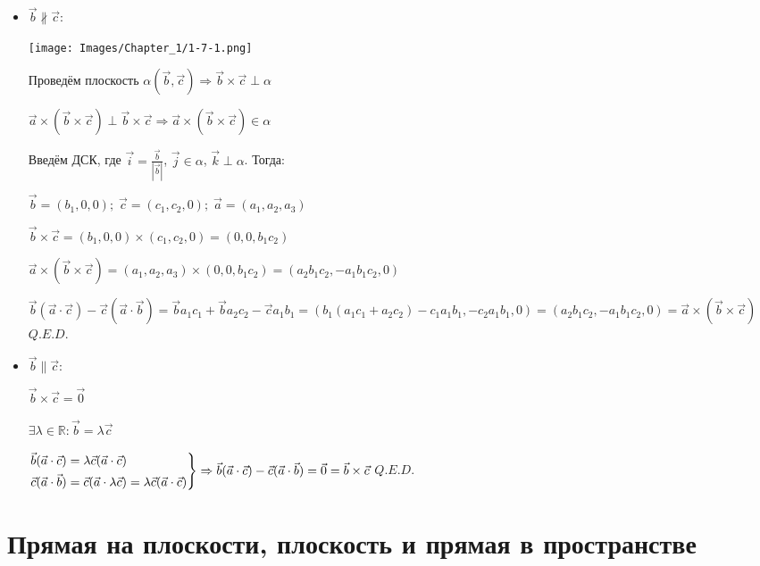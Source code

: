 \begin{itemize}
    \item \(\vec b \nparallel \vec c\):
          \begin{center}
              \texttt{[image: Images/Chapter\_1/1-7-1.png]}
          \end{center}
          Проведём плоскость \(\alpha(\vec b, \vec c) \Rightarrow \vec b \times \vec c \perp \alpha\)

          \(\vec a \times (\vec b \times \vec c) \perp \vec b \times \vec c \Rightarrow \vec a \times (\vec b \times \vec c) \in \alpha\)

          Введём ДСК, где \(\vec i = \frac{\vec b}{|\vec b|}\), \(\vec j \in \alpha\), \(\vec k \perp \alpha\). Тогда:

          \(\vec b = (b_1, 0, 0);\; \vec c = (c_1, c_2, 0);\; \vec a = (a_1, a_2, a_3)\)

          \(\vec b \times \vec c = (b_1, 0, 0) \times (c_1, c_2, 0) = (0, 0, b_1 c_2)\)

          \(\vec a \times (\vec b \times \vec c) = (a_1, a_2, a_3) \times (0, 0, b_1 c_2) = (a_2 b_1 c_2, -a_1 b_1 c_2, 0)\)

          \(\vec b(\vec a \cdot \vec c) - \vec c(\vec a \cdot \vec b) = \vec b a_1 c_1 + \vec b a_2 c_2 - \vec c a_1 b_1 =
          (b_1(a_1 c_1 + a_2 c_2) - c_1 a_1 b_1, -c_2 a_1 b_1, 0) =
          (a_2 b_1 c_2, -a_1 b_1 c_2, 0) = \vec a \times (\vec b \times \vec c)\) \(Q.E.D.\)
    \item \(\vec b \parallel \vec c\):

          \(\vec b \times \vec c = \vec 0\)

          \(\exists \lambda \in \mathbb{R}: \vec b = \lambda \vec c\)

          \(\begin{rcases}
              \vec b(\vec a \cdot \vec c) = \lambda \vec c(\vec a \cdot \vec c) \\
              \vec c(\vec a \cdot \vec b) = \vec c(\vec a \cdot \lambda\vec c) = \lambda \vec c(\vec a \cdot \vec c)
          \end{rcases} \Rightarrow \vec b(\vec a \cdot \vec c) - \vec c(\vec a \cdot \vec b) = \vec 0 = \vec b \times \vec c\) \(Q.E.D.\)
\end{itemize}

\newpage

\section{Прямая на плоскости, плоскость и прямая в пространстве}
